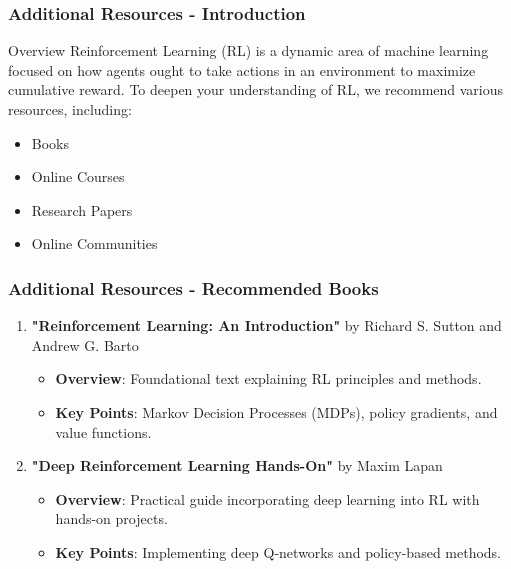 \documentclass[aspectratio=169]{beamer}
\begin{document}
\begin{frame}[fragile]
    \frametitle{Additional Resources - Introduction}
    \begin{block}{Overview}
        Reinforcement Learning (RL) is a dynamic area of machine learning focused on how agents ought to take actions in an environment to maximize cumulative reward. To deepen your understanding of RL, we recommend various resources, including:
    \end{block}
    \begin{itemize}
        \item Books
        \item Online Courses
        \item Research Papers
        \item Online Communities
    \end{itemize}
\end{frame}

\begin{frame}[fragile]
    \frametitle{Additional Resources - Recommended Books}
    \begin{enumerate}
        \item \textbf{"Reinforcement Learning: An Introduction"} by Richard S. Sutton and Andrew G. Barto
        \begin{itemize}
            \item \textbf{Overview}: Foundational text explaining RL principles and methods.
            \item \textbf{Key Points}: Markov Decision Processes (MDPs), policy gradients, and value functions.
        \end{itemize}

        \item \textbf{"Deep Reinforcement Learning Hands-On"} by Maxim Lapan
        \begin{itemize}
            \item \textbf{Overview}: Practical guide incorporating deep learning into RL with hands-on projects.
            \item \textbf{Key Points}: Implementing deep Q-networks and policy-based methods.
        \end{itemize}
    \end{enumerate}
\end{frame}
\end{document}
